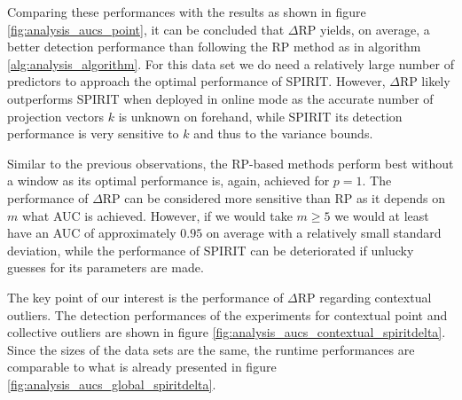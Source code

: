 Comparing these performances with the results as shown in figure \ref{fig:analysis_aucs_point}, it can be concluded that $\Delta$RP yields, on average, a better detection performance than following the RP method as in algorithm \ref{alg:analysis_algorithm}.
For this data set we do need a relatively large number of predictors to approach the optimal performance of SPIRIT. However, $\Delta$RP likely outperforms SPIRIT when deployed in online mode as the accurate number of projection vectors $k$ is unknown on forehand, while SPIRIT its detection performance is very sensitive to $k$ and thus to the variance bounds.

Similar to the previous observations, the RP-based methods perform best without a window as its optimal performance is, again, achieved for $p=1$. The performance of $\Delta$RP can be considered more sensitive than RP as it depends on $m$ what AUC is achieved. However, if we would take $m \geq 5$ we would at least have an AUC of approximately $0.95$ on average with a relatively small standard deviation, while the performance of SPIRIT can be deteriorated if unlucky guesses for its parameters are made. 

\newpage
The key point of our interest is the performance of $\Delta$RP regarding contextual outliers. The detection performances of the experiments for contextual point and collective outliers are shown in figure \ref{fig:analysis_aucs_contextual_spiritdelta}. Since the sizes of the data sets are the same, the runtime performances are comparable to what is already presented in figure \ref{fig:analysis_aucs_global_spiritdelta}.

